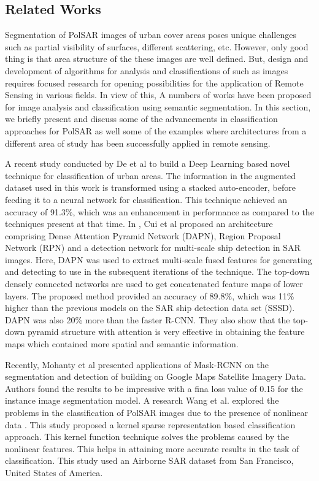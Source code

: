 \documentclass[a4paper,12pt]{spieman}  %
\begin{document}
\begin{spacing}{1}
\section{Related Works}
Segmentation of PolSAR images of urban cover areas poses unique challenges such as partial visibility of surfaces, different scattering, etc. However, only good thing is that area structure of the these images are well defined. But, design and development of algorithms for analysis and classifications of such as images requires focused research for opening possibilities for the application of Remote Sensing in various fields. In view of this, A numbers of works have been proposed for image analysis and classification using semantic segmentation. In this section, we briefly present and discuss some of the advancements in classification approaches for PolSAR as well some of the examples where architectures from a different area of study has been successfully applied in remote sensing.
\par A recent study conducted by De et al\citep{8068203} to build a Deep Learning based novel technique for classification of urban areas. The information in the augmented dataset used in this work is transformed using a stacked auto-encoder, before feeding it to a neural network for classification. This technique achieved an accuracy of 91.3\%, which was an enhancement in performance as compared to the techniques present at that time. In \citep{8763918}, Cui et al proposed an architecture comprising Dense Attention Pyramid Network (DAPN), Region Proposal Network (RPN) and a detection network for multi-scale ship detection in SAR images. Here, DAPN was used to extract multi-scale fused features for generating and detecting to  use in the subsequent iterations of the technique. The top-down densely connected networks are used to get concatenated feature maps of lower layers. The proposed method provided an accuracy of 89.8\%, which was 11\% higher than the previous models on the SAR ship detection data set (SSSD). DAPN was also 20\% more than the faster R-CNN\citep{ren2015faster}. They also show that the top-down pyramid structure with attention is very effective in obtaining the feature maps which contained more spatial and semantic information.
\par Recently, Mohanty et al presented applications of Mask-RCNN \cite{mrccnbuildling} on the segmentation and detection of building on Google Maps Satellite Imagery Data. Authors found the results to be impressive with a fina loss value of 0.15 for the instance image segmentation model. A research Wang et al. explored the problems in the classification of PolSAR images due to the presence of nonlinear data \citep{wang2018polarimetric}. This study proposed a kernel sparse representation based classification approach. This kernel function technique solves the problems caused by the nonlinear features. This helps in attaining more accurate results in the task of classification. This study used an Airborne SAR dataset from San Francisco, United States of America.

\end{spacing}
\end{document}
